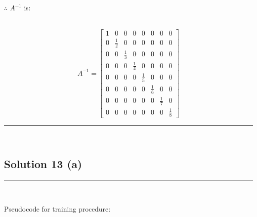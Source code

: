 \documentclass{article}
\begin{document}
\parbox{\textwidth}{$\therefore$ $A^{-1}$ is:}\\
$$A^{-1} = \begin{bmatrix}
    1 & 0 & 0 & 0 & 0 & 0 & 0 & 0 \\
    0 & \frac{1}{2} & 0 & 0 & 0 & 0 & 0 & 0 \\
    0 & 0 & \frac{1}{3} & 0 & 0 & 0 & 0 & 0 \\
    0 & 0 & 0 & \frac{1}{4} & 0 & 0 & 0 & 0 \\
    0 & 0 & 0 & 0 & \frac{1}{5} & 0 & 0 & 0 \\
    0 & 0 & 0 & 0 & 0 & \frac{1}{6} & 0 & 0 \\
    0 & 0 & 0 & 0 & 0 & 0 & \frac{1}{7} & 0 \\
    0 & 0 & 0 & 0 & 0 & 0 & 0 & \frac{1}{8}
\end{bmatrix}$$
\noindent\rule{\textwidth}{0.4pt}\\
\newpage
\subsection*{Solution 13 (a)}

\noindent\rule{\textwidth}{0.4pt}\\

\parbox{\textwidth}{Pseudocode for training procedure:}\\
\end{document}
